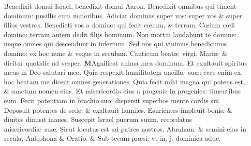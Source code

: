\documentclass[a5paper,10pt]{book}
\def\ae{æ}
\def\oe{œ}
\begin{document}
\begin{multicols*}{2}
\newline \color{red} B\color{black}enedixit domui Israel, benedixit domui Aaron.
\newline \color{red} B\color{black}enedixit omnibus qui timent dominum: pusillis cum maioribus.
\newline \color{red} A\color{black}diciat dominus super vos: super vos \& super filios vestros.
\newline \color{red} B\color{black}enedicti vos a domino: qui fecit c\oe lum, \& terram.
\newline \color{red} C\color{black}\oe lum c\oe li domino: terram autem dedit filijs hominum.
\newline \color{red} N\color{black}on mortui laudabunt te domine: neque omnes qui descendunt in infernum.
\newline \color{red} S\color{black}ed nos qui viuimus benedicimus domino: ex hoc nunc \& vsque in seculum.
\newline \color{red} \hypertarget{Magnificat}{Canticum} beat\ae \ virgi. Mari\ae \ \& dicitur quotidie ad vesper. \color{black}
\lettrine[lines=2]{\bfseries \color{red} M}{}Agnificat anima mea dominum.
\newline \linebreak
\noindent \color{red} E\color{black}t exultauit spiritus meus in Deo salutari meo.
\newline \color{red} Q\color{black}uia respexit humilitatem ancill\ae \ su\ae : ecce enim ex hoc beatam me dicent omnes generationes.
\newline \color{red} Q\color{black}uia fecit mihi magna qui potens est, \& sanctum nomen eius.
\newline \color{red} E\color{black}t misericordia eius a progenie in progenies: timentibus eum.
\newline \color{red} F\color{black}ecit potentiam in brachio suo: dispersit superbos mente cordis sui.
\newline \color{red} D\color{black}eposuit potentes de sede: \& exaltauit humiles.
\newline \color{red} E\color{black}surientes impleuit bonis: \& diuites dimisit inanes.
\newline \color{red} S\color{black}uscepit Israel puerum suum, recordatus misericordi\ae \ su\ae .
\newline \color{red} S\color{black}icut locutus est ad patres nostros, Abraham: \& semini eius in secula. 
\newline \color{red} Antiphona \& Oratio. \color{black} \& Sub teeum pr\ae si. \color{red} vt in. j. dominica adue. \color{black}

\end{multicols*}
\end{document}
